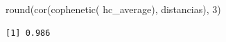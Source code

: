 \documentclass[oneside, openany, fontset=libertinus]{mitthesis}
\newenvironment{Shaded}{\begin{snugshade}}{\end{snugshade}}
\newcommand{\DecValTok}[1]{\textcolor[rgb]{0.68,0.00,0.00}{#1}}
\newcommand{\FunctionTok}[1]{\textcolor[rgb]{0.28,0.35,0.67}{#1}}
\newcommand{\NormalTok}[1]{\textcolor[rgb]{0.00,0.23,0.31}{#1}}
\newenvironment{codres}%
  {\par\smallskip\noindent\begin{minipage}[t]{0.57\linewidth}\vspace{0pt}}%
  {\end{minipage}\par\medskip}
\newcommand{\codressep}{\end{minipage}\hfill\begin{minipage}[t]{0.40\linewidth}\vspace{0pt}}
\begin{document}
\Needspace{1.14in}

\begin{codres}

\begin{Shaded}
\begin{Highlighting}[]
\FunctionTok{round}\NormalTok{(}\FunctionTok{cor}\NormalTok{(}\FunctionTok{cophenetic}\NormalTok{(}
\NormalTok{  hc\_average), distancias), }\DecValTok{3}\NormalTok{)}
\end{Highlighting}
\end{Shaded}

\codressep

\begin{verbatim}
[1] 0.986
\end{verbatim}

\end{codres}

\Needspace{7.72in}
\end{document}
